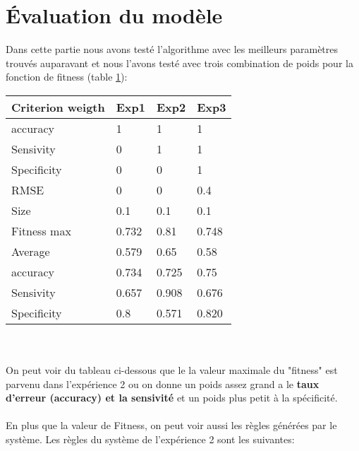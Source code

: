 \newpage
\section{Évaluation du modèle}

Dans cette partie nous avons testé l'algorithme avec les meilleurs paramètres trouvés auparavant et nous l'avons testé avec trois combination de poids pour la fonction de fitness (table \ref{table_param}):


\begin{table}[h]
\begin{tabular}{|l|l|l|l|}
\hline
\textbf{Criterion weigth} & \textbf{Exp1} & \textbf{Exp2} & \textbf{Exp3} \\ \hline
accuracy                 & 1             & 1             & 1             \\ \hline
Sensivity                & 0             & 1             & 1             \\ \hline
Specificity              & 0             & 0             & 1             \\ \hline
RMSE                     & 0             & 0             & 0.4           \\ \hline
Size                     & 0.1           & 0.1           & 0.1           \\ \hline
Fitness max              & 0.732         & 0.81          & 0.748         \\ \hline
Average                  & 0.579         & 0.65          & 0.58          \\ \hline
accuracy                 & 0.734         & 0.725         & 0.75          \\ \hline
Sensivity                & 0.657         & 0.908         & 0.676         \\ \hline
Specificity              & 0.8           & 0.571         & 0.820         \\ \hline
\end{tabular}
\label{table_param}
\end{table}\\
\\
On peut voir du tableau ci-dessous que le la valeur maximale du "fitness" est parvenu dans l'expérience 2 ou on donne un poids assez grand a le \textbf{taux d'erreur (accuracy) et la sensivité} et un poids plus petit à la spécificité.
\\\\
En plus que la valeur de Fitness, on peut voir aussi les règles générées par le système.
Les règles du système de l'expérience 2 sont les suivantes:
